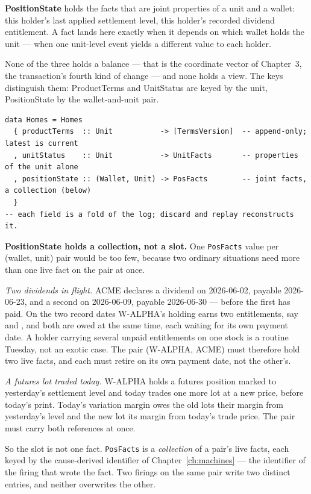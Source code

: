 \textbf{PositionState} holds the facts that are joint properties of a unit and a wallet:
this holder's last applied settlement level, this holder's recorded dividend entitlement.
A fact lands here exactly when it depends on which wallet holds the unit --- when one
unit-level event yields a different value to each holder.

None of the three holds a balance --- that is the coordinate vector of
Chapter~3, the transaction's fourth kind of change --- and none holds a
view. The keys distinguish them: ProductTerms and UnitStatus are keyed by the unit,
PositionState by the wallet-and-unit pair.

\begin{lstlisting}
data Homes = Homes
  { productTerms  :: Unit           -> [TermsVersion]  -- append-only; latest is current
  , unitStatus    :: Unit           -> UnitFacts       -- properties of the unit alone
  , positionState :: (Wallet, Unit) -> PosFacts        -- joint facts, a collection (below)
  }
-- each field is a fold of the log; discard and replay reconstructs it.
\end{lstlisting}

\medskip\noindent\textbf{PositionState holds a collection, not a slot.} One
\texttt{PosFacts} value per (wallet, unit) pair would be too few, because two ordinary
situations need more than one live fact on the pair at once.

\emph{Two dividends in flight.} ACME declares a dividend on 2026-06-02, payable 2026-06-23,
and a second on 2026-06-09, payable 2026-06-30 --- before the first has paid. On the two
record dates W-ALPHA's holding earns two entitlements, say  and ,
and both are owed at the same time, each waiting for its own payment date. A holder carrying
several unpaid entitlements on one stock is a routine Tuesday, not an exotic case. The pair
(W-ALPHA, ACME) must therefore hold two live facts, and each must retire on its own payment
date, not the other's.

\emph{A futures lot traded today.} W-ALPHA holds a futures position marked to yesterday's
settlement level and today trades one more lot at a new price, before today's print. Today's
variation margin owes the old lots their margin from yesterday's level and the new lot its
margin from today's trade price. The pair must carry both references at once.

So the slot is not one fact. \texttt{PosFacts} is a \emph{collection} of a pair's live facts,
each keyed by the cause-derived identifier of Chapter~\ref{ch:machines} --- the identifier of
the firing that wrote the fact. Two firings on the same pair write two distinct entries, and
neither overwrites the other.

